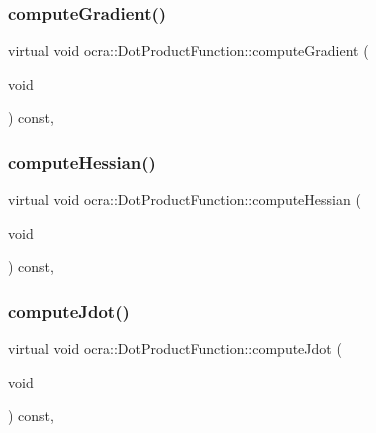 \subsubsection{\texorpdfstring{compute\+Gradient()}{computeGradient()}}
{\footnotesize\ttfamily virtual void ocra\+::\+Dot\+Product\+Function\+::compute\+Gradient (\begin{DoxyParamCaption}\item[{void}]{ }\end{DoxyParamCaption}) const\hspace{0.3cm}{\ttfamily [protected]}, {\ttfamily [virtual]}}

\hypertarget{classocra_1_1DotProductFunction_a97dcdd721c76f80cb20e257aca4f8a58}{}\label{classocra_1_1DotProductFunction_a97dcdd721c76f80cb20e257aca4f8a58} 
\subsubsection{\texorpdfstring{compute\+Hessian()}{computeHessian()}}
{\footnotesize\ttfamily virtual void ocra\+::\+Dot\+Product\+Function\+::compute\+Hessian (\begin{DoxyParamCaption}\item[{void}]{ }\end{DoxyParamCaption}) const\hspace{0.3cm}{\ttfamily [protected]}, {\ttfamily [virtual]}}

\hypertarget{classocra_1_1DotProductFunction_a707474c43d42fad3a8c5bbd896ca8f4b}{}\label{classocra_1_1DotProductFunction_a707474c43d42fad3a8c5bbd896ca8f4b} 
\subsubsection{\texorpdfstring{compute\+Jdot()}{computeJdot()}}
{\footnotesize\ttfamily virtual void ocra\+::\+Dot\+Product\+Function\+::compute\+Jdot (\begin{DoxyParamCaption}\item[{void}]{ }\end{DoxyParamCaption}) const\hspace{0.3cm}{\ttfamily [protected]}, {\ttfamily [virtual]}}

